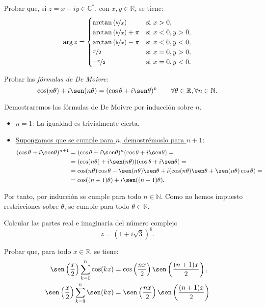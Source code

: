 \begin{ejercicio}
    Probar que, si $z = x+iy \in \mathbb{C}^*$, con $x,y \in \mathbb{R}$, se tiene:
    \[
        \arg z = \begin{cases}
            \arctan\left(\nicefrac{y}{x}\right) & \text{si } x > 0, \\
            \arctan\left(\nicefrac{y}{x}\right) + \pi & \text{si } x < 0, y > 0, \\
            \arctan\left(\nicefrac{y}{x}\right) - \pi & \text{si } x < 0, y < 0, \\
            \nicefrac{\pi}{2} & \text{si } x = 0, y > 0, \\
            \nicefrac{-\pi}{2} & \text{si } x = 0, y < 0.
        \end{cases}
    \]
\end{ejercicio}

\begin{ejercicio}
    Probar las \emph{fórmulas de De Moivre}:
    \[
        \cos(n\theta) + i\sen(n\theta) = (\cos\theta + i\sen\theta)^n \qquad \forall \theta \in \mathbb{R}, \forall n \in \mathbb{N}.
    \]

    Demostraremos las fórmulas de De Moivre por inducción sobre $n$.
    \begin{itemize}
        \item \ul{$n=1$}: La igualdad es trivialmente cierta.
        \item \ul{Supongamos que se cumple para $n$, demostrémoslo para $n+1$}:
        \begin{align*}
            (\cos\theta + i\sen\theta)^{n+1}
            &= (\cos\theta + i\sen\theta)^n(\cos\theta + i\sen\theta)
            =\\&= (\cos(n\theta) + i\sen(n\theta))(\cos\theta + i\sen\theta)
            =\\&= \cos(n\theta)\cos\theta - \sen(n\theta)\sen\theta + i(\cos(n\theta)\sen\theta + \sen(n\theta)\cos\theta) = \\&=
            \cos((n+1)\theta) + i\sen((n+1)\theta).
        \end{align*}
    \end{itemize}

    Por tanto, por inducción se cumple para todo $n\in \mathbb{N}$. Como no hemos impuesto restricciones sobre $\theta$, se cumple para todo $\theta \in \mathbb{R}$.
\end{ejercicio}

\begin{ejercicio}
    Calcular las partes real e imaginaria del número complejo
    \[
        z=\left(1+i\sqrt{3}\right)^8.
    \]
\end{ejercicio}

\begin{ejercicio}
    Probar que, para todo $x \in \mathbb{R}$, se tiene:
    \begin{align}
        \sen\left(\frac{x}{2}\right)\sum_{k=0}^n \cos(kx) &= \cos \left(\dfrac{nx}{2}\right) \sen\left(\dfrac{(n+1)x}{2}\right), \\
        \sen\left(\frac{x}{2}\right)\sum_{k=0}^n \sen(kx) &= \sen \left(\dfrac{nx}{2}\right) \sen\left(\dfrac{(n+1)x}{2}\right)
    \end{align}
\end{ejercicio}